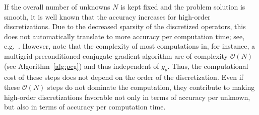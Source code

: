\documentclass[smallcondensed,final]{svjour3}     %
\begin{document}


%
%


If the overall number of unknowns $N$ is kept fixed and the problem
solution is smooth, it is well known that the accuracy increases for
high-order discretizations. Due to the decreased sparsity of the
discretized operators, this does not automatically translate to more
accuracy per computation time; see, e.g.~\cite{Brown10}. However, note
that the complexity of most computations in, for instance, a multigrid
preconditioned conjugate gradient algorithm are of complexity
$\mathcal{O}(N)$ (see Algorithm~\ref{alg:pcg}) and thus independent of
$g_p$. Thus, the computational cost of these steps does not depend on
the order of the discretization. Even if these $\mathcal{O}(N)$ steps
do not dominate the computation, they contribute to making high-order
discretizations favorable not only in terms of accuracy per unknown,
but also in terms of accuracy per computation time.
\end{document}
